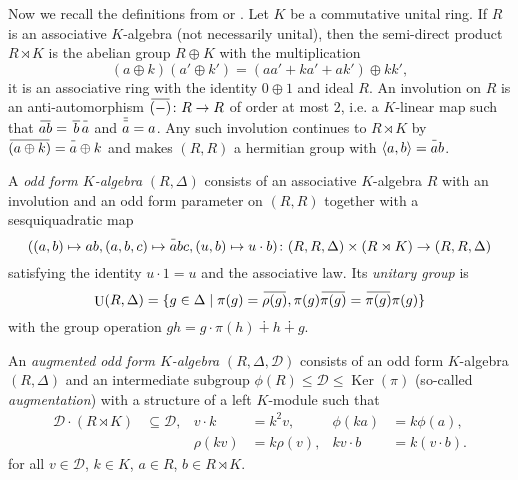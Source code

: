 \documentclass{article}
\theoremstyle{definition}
\DeclareMathOperator\unit{U}
\DeclareMathOperator\Ker{Ker}
\newcommand{\inv}[1]{
    \!\;\overline{
        \!\!\:#1\vphantom !\!\!\:
    }\;\!
}
\begin{document}
Now we recall the definitions from \cite[\S\S 1.4--1.7, 2.1, 2.2]{thesis} or \cite[\S\S 3, 4]{classic-ofa}. Let \(K\) be a commutative unital ring. If \(R\) is an associative \(K\)-algebra (not necessarily unital), then the semi-direct product \(R \rtimes K\) is the abelian group \(R \oplus K\) with the multiplication \[
    (a \oplus k) (a' \oplus k') = (aa' + ka' + ak') \oplus kk',
\] it is an associative ring with the identity \(
    0 \oplus 1
\) and ideal \(R\). An involution on \(R\) is an anti-automorphism \(
    \inv{(-)} \colon R \to R
\) of order at most \(2\), i.e. a \(K\)-linear map such that \(
    \inv{ab} = \inv{\,b\,} \inv a
\) and \(
    \inv{\inv a} = a
\). Any such involution continues to \(R \rtimes K\) by \(
    \inv{ (a \oplus k) } = \inv a \oplus k
\) and makes \((R, R)\) a hermitian group with \(
    \langle a, b \rangle = \inv ab
\).

A \textit{odd form \(K\)-algebra} \(
    (R, \Delta)
\) consists of an associative \(K\)-algebra \(R\) with an involution and an odd form parameter on \((R, R)\) together with a sesquiquadratic map \[
    (
        (a, b) \mapsto ab,
        (a, b, c) \mapsto \inv a b c,
        (u, b) \mapsto u \cdot b
    )
    \colon (R, R, \Delta) \times (R \rtimes K)
    \to (R, R, \Delta)
\] satisfying the identity \(
u \cdot 1 = u
\) and the associative law. Its \textit{unitary group} is \[
    \unit(R, \Delta) = \{
        g \in \Delta
        \mid
        \pi(g) = \inv{\rho(g)},
        \pi(g) \inv{\pi(g)} = \inv{\pi(g)} \pi(g)
    \}
\]
with the group operation \(
    gh = g \cdot \pi(h) \dotplus h \dotplus g
\).

An \textit{augmented odd form \(K\)-algebra} \(
    (R, \Delta, \mathcal D)
\)  consists of an odd form \(K\)-algebra \((R, \Delta)\) and an intermediate subgroup \(\phi(R) \leq \mathcal D \leq \Ker(\pi)\) (so-called \textit{augmentation}) with a structure of a left \(K\)-module such that
\begin{align*}
    \mathcal D \cdot (R \rtimes K)
    &\subseteq \mathcal D,
    &
    v \cdot k &= k^2 v,
    &
    \phi(ka) &= k \phi(a),
    \\ &&
    \rho(kv) &= k \rho(v),
    &
    kv \cdot b &= k(v \cdot b).
\end{align*}
for all \(v \in \mathcal D\), \(k \in K\), \(a \in R\), \(b \in R \rtimes K\).
\end{document}
